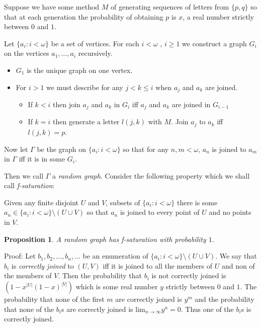 \documentclass[12pt]{article}
\newtheorem{pp}{Proposition}
\begin{document}
Suppose we have some method $M$ of generating sequences of letters from $\{p,q\}$ so that at each generation the probability of obtaining $p$ is $x$, a real number strictly between $0$ and $1$. 

Let $\{a_{i}:i<\omega\}$ be a set of vertices. For each $i<\omega$ , $i\geq 1$  we construct a graph $G_{i}$ on the vertices $a_{1},\ldots,a_{i}$ recursively.

\begin{itemize} \item $G_{1}$ is the unique graph on one vertex.

\item For $i>1$ we must describe for any $j<k\leq i$ when  $a_{j}$ and $a_{k}$ are joined.
\begin{itemize} \item If $k<i$ then join $a_{j}$ and $a_{k}$ in $G_{i}$ iff $a_{j}$ and $a_{k}$ are joined in $G_{i-1}$ 
\item If $k=i$ then generate a letter $l(j,k)$ with $M$. Join $a_{j}$ to $a_{k}$ iff $l(j,k)=p$.
\end{itemize}
\end{itemize}

Now let $\Gamma$ be the graph on $\{a_{i}:i<\omega\}$ so that for any $n,m <\omega$, $a_{n}$ is joined to $a_{m}$ in $\Gamma$ iff it is in some $G_{i}$.

Then we call $\Gamma$ a \emph{random graph}. Consider the following property which we shall call \emph{f-saturation}:

Given any finite disjoint $U$ and $V$, subsets of $\{a_{i}:i<\omega\}$ there is some $a_{n} \in \{a_{i}:i<\omega\} \setminus (U \cup V)$ so that $a_{n}$ is joined to every point of $U$ and no points in $V$.

\begin{pp} A random graph has f-saturation with probability $1$.
\end{pp}
Proof: Let $b_{1},b_{2},\ldots,b_{n},\ldots$ be an enumeration of $\{a_{i}:i<\omega\} \setminus (U \cup V)$. 
We say that $b_{i}$ is {\em correctly joined}
 to $(U,V)$ iff it is joined to all the members of $U$ and non of the members of $V$. Then the probability that $b_{i}$ is not correctly joined is $(1-x^{|U|}(1-x)^{|V|})$ which is some real number $y$ strictly between $0$ and $1$. 
The probability that none of the first $m$ are correctly joined is $y^{m}$ and the probability that none of the $b_{i}$s are correctly joined is $\textrm{lim}_{n \to \infty} y^{n}=0$. Thus one of the $b_{i}$s is correctly joined.
\end{document}
